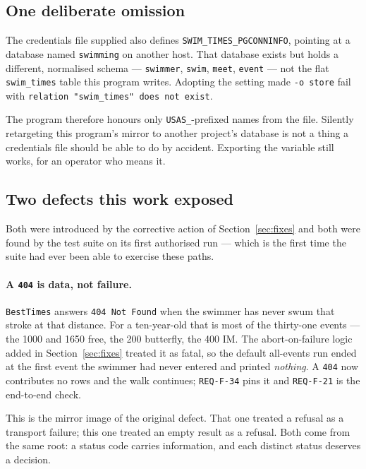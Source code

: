 \documentclass[11pt]{article}
\newcommand{\code}[1]{\texttt{#1}}
\newcommand{\req}[1]{\texttt{#1}}
\begin{document}
\subsection{One deliberate omission}

The credentials file supplied also defines
\code{SWIM\_TIMES\_PGCONNINFO}, pointing at a database named
\code{swimming} on another host.  That database exists but holds a
different, normalised schema --- \code{swimmer}, \code{swim},
\code{meet}, \code{event} --- not the flat \code{swim\_times} table this
program writes.  Adopting the setting made \code{-o store} fail with
\code{relation "swim\_times" does not exist}.

The program therefore honours only \code{USAS\_}-prefixed names from
the file.  Silently retargeting this program's mirror to another
project's database is not a thing a credentials file should be able to
do by accident.  Exporting the variable still works, for an operator who
means it.

\subsection{Two defects this work exposed}

Both were introduced by the corrective action of
Section~\ref{sec:fixes} and both were found by the test suite on its
first authorised run --- which is the first time the suite had ever been
able to exercise these paths.

\paragraph{A \code{404} is data, not failure.}
\code{BestTimes} answers \code{404 Not Found} when the swimmer has
never swum that stroke at that distance.  For a ten-year-old that is
most of the thirty-one events --- the 1000 and 1650 free, the 200
butterfly, the 400 IM.  The abort-on-failure logic added in
Section~\ref{sec:fixes} treated it as fatal, so the default all-events
run ended at the first event the swimmer had never entered and printed
\emph{nothing}.  A \code{404} now contributes no rows and the walk
continues; \req{REQ-F-34} pins it and \req{REQ-F-21} is the end-to-end
check.

This is the mirror image of the original defect.  That one treated a
refusal as a transport failure; this one treated an empty result as a
refusal.  Both come from the same root: a status code carries
information, and each distinct status deserves a decision.
\end{document}
